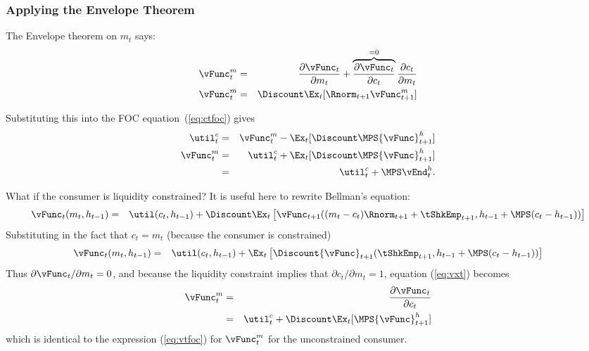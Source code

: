 \documentclass[titlepage]{\econtex}
\begin{document}
{  \hypertarget{Applying-the-Envelope-Theorem}{}
  \subsubsection{Applying the Envelope Theorem}
  The Envelope theorem on ${m}_{t}$ says:
  \begin{eqnarray}
    {\vFunc}^{m}_{t} & = & \frac{\partial {\vFunc}_{t}}{\partial {m}_{t}} + \overbrace{\frac{\partial {\vFunc}_{t}}{\partial {c}_{t}}}^{=0}\frac{\partial {c}_{t}}{\partial {m}_{t}} \label{eq:vxt} \\
    {\vFunc}_{t}^{m} & = & \Discount  \Ex_{t} [\Rnorm_{t+1} {\vFunc}_{t+1}^{m}] \label{eq:envelopex}
  \end{eqnarray}

  Substituting this into the FOC equation~(\ref{eq:ctfoc}) gives
  \begin{eqnarray}
    \util^{c}_{t} & = & {\vFunc}_{t}^{m}-\Ex_{t}[\Discount \MPS {\vFunc}_{t+1}^{h}] \label{eq:ctfocsubx}
    \\ {\vFunc}_{t}^{m} & = & \util^{c}_{t}+\Ex_{t}[\Discount \MPS {\vFunc}_{t+1}^{h}] \label{eq:vtfoc}
    \\           & = & \util^{c}_{t}+\MPS \vEnd_{t}^{h} \label{eq:vxtformula}.
  \end{eqnarray}

  What if the consumer is liquidity constrained?  It is useful here to 
  rewrite Bellman's equation:
  \begin{eqnarray}
    {\vFunc}_{t}({m}_{t},h_{t-1}) & = & \util({c}_{t},h_{t-1}) +  \Discount \Ex_{t}
                                        \left[{\vFunc}_{t+1}(({m}_{t}-{c}_{t})\Rnorm_{t+1}+{\tShkEmp}_{t+1},h_{t-1}+\MPS({c}_{t}-h_{t-1}))
                                        \right] \nonumber
  \end{eqnarray}
  Substituting in the fact that ${c}_{t}={m}_{t}$ (because the consumer is constrained)
  \begin{eqnarray}
    {\vFunc}_{t}({m}_{t},h_{t-1}) & = & \util({c}_{t},h_{t-1}) +  \Ex_{t}\left[\Discount
                                        {\vFunc}_{t+1}({\tShkEmp}_{t+1},h_{t-1}+\MPS({c}_{t}-h_{t-1}))\right]
                                        \nonumber
  \end{eqnarray}
  Thus $\partial {\vFunc}_{t}/\partial {m}_{t} = 0$, and because the liquidity
  constraint implies that $\partial {c}_{t}/\partial {m}_{t} = 1$,
  equation (\ref{eq:vxt}) becomes
  \begin{eqnarray}
    {\vFunc}_{t}^{m}  & = &  \frac{\partial {\vFunc}_{t}}{\partial {c}_{t}}
    \\             & = & \util_{t}^{c} + \Discount \Ex_{t} [\MPS {\vFunc}_{t+1}^{h}]
  \end{eqnarray}
  which is identical to the expression (\ref{eq:vtfoc}) for ${\vFunc}_{t}^{m}$
  for the unconstrained consumer.

}
\end{document}
